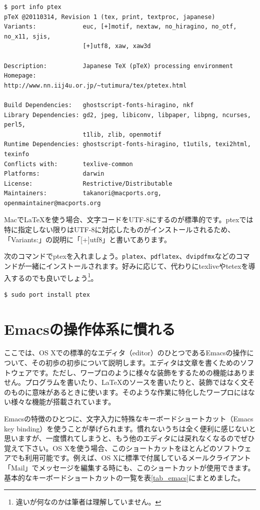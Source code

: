 \begin{lstlisting}
$ port info ptex   
pTeX @20110314, Revision 1 (tex, print, textproc, japanese)
Variants:             euc, [+]motif, nextaw, no_hiragino, no_otf, no_x11, sjis,
                      [+]utf8, xaw, xaw3d

Description:          Japanese TeX (pTeX) processing environment
Homepage:             http://www.nn.iij4u.or.jp/~tutimura/tex/ptetex.html

Build Dependencies:   ghostscript-fonts-hiragino, nkf
Library Dependencies: gd2, jpeg, libiconv, libpaper, libpng, ncurses, perl5,
                      t1lib, zlib, openmotif
Runtime Dependencies: ghostscript-fonts-hiragino, t1utils, texi2html, texinfo
Conflicts with:       texlive-common
Platforms:            darwin
License:              Restrictive/Distributable
Maintainers:          takanori@macports.org, openmaintainer@macports.org
\end{lstlisting}

Macで\LaTeX{}を使う場合、文字コードをUTF-8にするのが標準的です。ptexでは特に指定しない限りはUTF-8に対応したものがインストールされるため、「Variants:」の説明に「[+]utf8」と書いてあります。

次のコマンドでptexを入れましょう。\texttt{platex}、\texttt{pdflatex}、\texttt{dvipdfmx}などのコマンドが一緒にインストールされます。好みに応じて、代わりにtexliveやtetexを導入するのでも良いでしょう\footnote{違いが何なのかは筆者は理解していません。}。

\begin{lstlisting}[language=bash]
$ sudo port install ptex
\end{lstlisting}

\section{Emacsの操作体系に慣れる}
\label{sec_Emacs}

ここでは、OS Xでの標準的なエディタ（editor）のひとつであるEmacsの操作について、その初歩の初歩について説明します。エディタは文章を書くためのソフトウェアです。ただし、ワープロのように様々な装飾をするための機能はありません。プログラムを書いたり、\LaTeX{}のソースを書いたりと、装飾ではなく文そのものに意味があるときに使います。そのような作業に特化したワープロにはない様々な機能が搭載されています。

Emacsの特徴のひとつに、文字入力に特殊なキーボードショートカット（Emacs key binding）を使うことが挙げられます。慣れないうちは全く便利に感じないと思いますが、一度慣れてしまうと、もう他のエディタには戻れなくなるのでぜひ覚えて下さい。OS Xを使う場合、このショートカットをほとんどのソフトウェアでも利用可能です。例えば、OS Xに標準で付属しているメールクライアント「Mail」でメッセージを編集する時にも、このショートカットが使用できます。基本的なキーボードショートカットの一覧を表\ref{tab_emacs}にまとめました。

